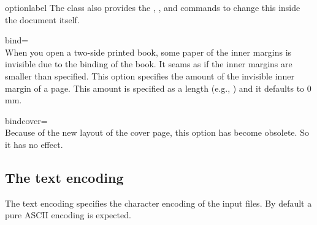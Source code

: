 \begin{labelled}{optionlabel}
  The  class also provides the , ,
  and  commands to change this inside the document itself.

\item[bind=\meta{binding length}]\\
  When you open a two-side printed book, some paper of the inner margins is
  invisible due to the binding of the book. It seams as if the inner
  margins are smaller than specified. This option specifies the amount
   of the invisible inner margin of a page. This amount
  is specified as a length (e.g., \opt{3mm}) and it defaults to
  0\,mm.


\item[bindcover=\meta{binding tape width}]%
  \\
  Because of the new layout of the cover page, this option has become
  obsolete. So it has no effect.
\end{labelled}

\subsection{The text encoding}
The text encoding specifies the character encoding of the input files. By
default a pure {\small ASCII} encoding is expected.

